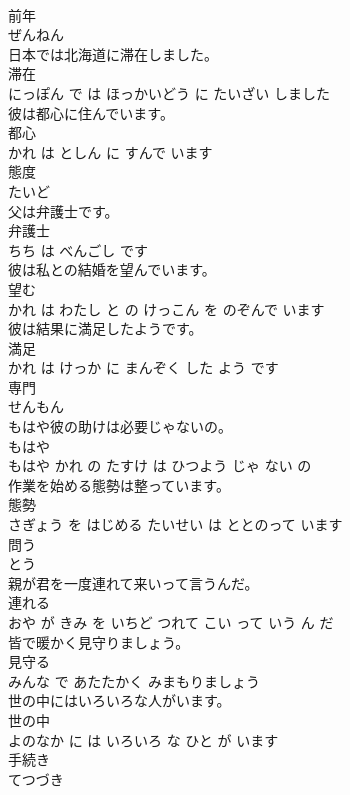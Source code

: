 \documentclass[8pt]{extreport}
\begin{document}
\begin{CJK}{UTF8}{min}
\\	前年	
\\	ぜんねん			
\\	日本では北海道に滞在しました。	
\\	滞在 
\\	にっぽん で は ほっかいどう に たいざい しました			
\\	彼は都心に住んでいます。	
\\	都心 
\\	かれ は としん に すんで います			
\\	態度	
\\	たいど			
\\	父は弁護士です。	
\\	弁護士 
\\	ちち は べんごし です			
\\	彼は私との結婚を望んでいます。	
\\	望む 
\\	かれ は わたし と の けっこん を のぞんで います			
\\	彼は結果に満足したようです。	
\\	満足 
\\	かれ は けっか に まんぞく した よう です			
\\	専門	
\\	せんもん			
\\	もはや彼の助けは必要じゃないの。	
\\	もはや 
\\	もはや かれ の たすけ は ひつよう じゃ ない の			
\\	作業を始める態勢は整っています。	
\\	態勢 
\\	さぎょう を はじめる たいせい は ととのって います			
\\	問う	
\\	とう			
\\	親が君を一度連れて来いって言うんだ。	
\\	連れる 
\\	おや が きみ を いちど つれて こい って いう ん だ			
\\	皆で暖かく見守りましょう。	
\\	見守る 
\\	みんな で あたたかく みまもりましょう			
\\	世の中にはいろいろな人がいます。	
\\	世の中 
\\	よのなか に は いろいろ な ひと が います			
\\	手続き	
\\	てつづき			

\end{CJK}
\end{document}
